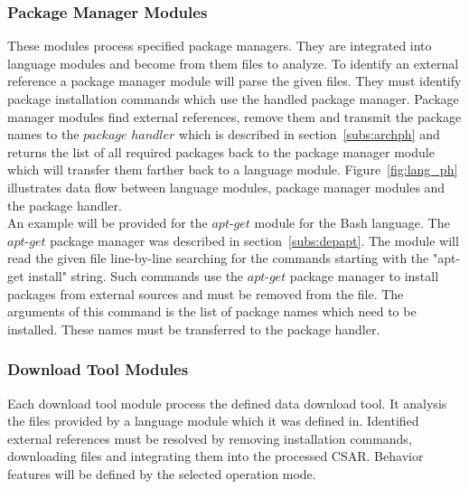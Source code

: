 \subsubsection{Package Manager Modules} \label{subs:archpmm}
These modules process specified package managers.
They are integrated into language modules and become from them files to analyze.
To identify an external reference a package manager module will parse the given files. 
They must identify package installation commands which use the handled package manager.
Package manager modules find external references, remove them and transmit the package names to the $package$ $handler$ which is described in section~\ref{subs:archph} and returns the list of all required packages back to the package manager module which will transfer them farther back to a language module.
Figure~\ref{fig:lang_ph} illustrates data flow between language modules, package manager modules and the package handler.\\
An example will be provided for the $apt$-$get$ module for the Bash language.
The $apt$-$get$ package manager was described in section~\ref{subs:depapt}.
The module will read the given file line-by-line searching for the commands starting with the "apt-get install" string.
Such commands use the $apt$-$get$ package manager to install packages from external sources and must be removed from the file.
The arguments of this command is the list of package names which need to be installed.
These names must be transferred to the package handler.


\subsubsection{Download Tool Modules}
Each download tool module process the defined data download tool.
It analysis the files provided by a language module which it was defined in.
Identified external references must be resolved by removing installation commands, downloading files and integrating them into the processed CSAR.
Behavior features will be defined by the selected operation mode.

